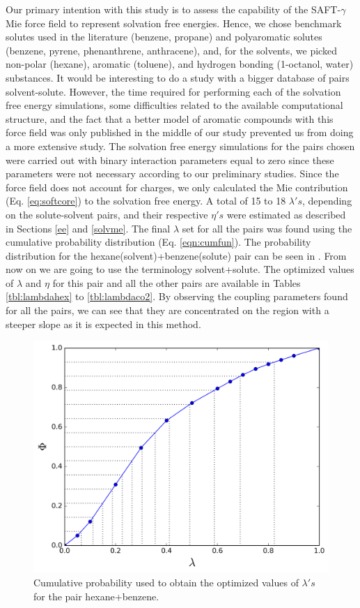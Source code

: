 Our primary intention with this study is to assess the capability of the SAFT-$\gamma$ Mie force field to represent solvation free energies. Hence, we chose benchmark solutes used in the literature (benzene, propane) and polyaromatic solutes (benzene, pyrene, phenanthrene, anthracene), and, for the solvents, we picked non-polar (hexane), aromatic (toluene), and hydrogen bonding (1-octanol, water) substances. It would be interesting to do a study with a bigger database of pairs solvent-solute. However, the time required for performing each of the solvation free energy simulations, some difficulties related to the available computational structure, and the fact that a better model of aromatic compounds with this force field was only published in the middle of our study prevented us from doing a more extensive study. The solvation free energy simulations for the pairs chosen were carried out with binary interaction parameters equal to zero since these parameters were not necessary according to our preliminary studies. Since the force field does not account for charges, we only calculated the Mie contribution (Eq. \eqref{eq:softcore}) to the solvation free energy. A total of 15 to 18 $\lambda 's$, depending on the solute-solvent pairs, and their respective $\eta 's$ were estimated as described in Sections \ref{ee} and \ref{solvme}. The final $\lambda$ set for all the pairs was found using the cumulative probability distribution (Eq. \eqref{eqn:cumfun}). The probability distribution for the hexane(solvent)+benzene(solute) pair can be seen in . From now on we are going to use the terminology solvent+solute. The optimized values of $\lambda$ and $\eta$ for this pair and all the other pairs are available in Tables \ref{tbl:lambdahex} to \ref{tbl:lambdaco2}. By observing the coupling parameters found for all the pairs, we can see that they are concentrated on the region with a steeper slope as it is expected in this method.
\FloatBarrier
\begin{figure}[h]
	\centering
	\includegraphics[width=0.8\linewidth]{Figures/optimized_cdf}
	\caption{Cumulative probability used to obtain the optimized values of $\lambda 's$ for the pair hexane+benzene.}
	\label{fig:optimized_cdf}
\end{figure}


